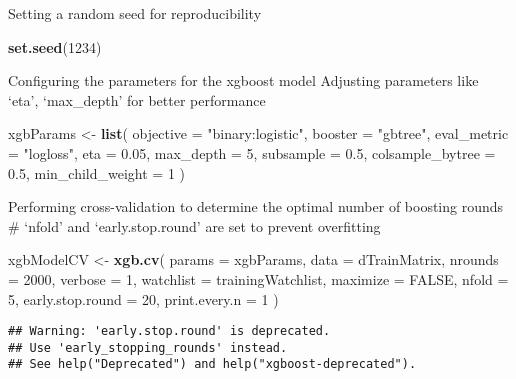 \documentclass[
]{article}
\newenvironment{Shaded}{\begin{snugshade}}{\end{snugshade}}
\newcommand{\AttributeTok}[1]{\textcolor[rgb]{0.13,0.29,0.53}{#1}}
\newcommand{\ConstantTok}[1]{\textcolor[rgb]{0.56,0.35,0.01}{#1}}
\newcommand{\DecValTok}[1]{\textcolor[rgb]{0.00,0.00,0.81}{#1}}
\newcommand{\FloatTok}[1]{\textcolor[rgb]{0.00,0.00,0.81}{#1}}
\newcommand{\FunctionTok}[1]{\textcolor[rgb]{0.13,0.29,0.53}{\textbf{#1}}}
\newcommand{\NormalTok}[1]{#1}
\newcommand{\OtherTok}[1]{\textcolor[rgb]{0.56,0.35,0.01}{#1}}
\newcommand{\StringTok}[1]{\textcolor[rgb]{0.31,0.60,0.02}{#1}}
\begin{document}
Setting a random seed for reproducibility

\begin{Shaded}
\begin{Highlighting}[]
\FunctionTok{set.seed}\NormalTok{(}\DecValTok{1234}\NormalTok{)}
\end{Highlighting}
\end{Shaded}

Configuring the parameters for the xgboost model Adjusting parameters
like `eta', `max\_depth' for better performance

\begin{Shaded}
\begin{Highlighting}[]
\NormalTok{xgbParams }\OtherTok{\textless{}{-}} \FunctionTok{list}\NormalTok{(}
  \AttributeTok{objective =} \StringTok{"binary:logistic"}\NormalTok{,}
  \AttributeTok{booster =} \StringTok{"gbtree"}\NormalTok{,}
  \AttributeTok{eval\_metric =} \StringTok{"logloss"}\NormalTok{,}
  \AttributeTok{eta =} \FloatTok{0.05}\NormalTok{,}
  \AttributeTok{max\_depth =} \DecValTok{5}\NormalTok{,}
  \AttributeTok{subsample =} \FloatTok{0.5}\NormalTok{,}
  \AttributeTok{colsample\_bytree =} \FloatTok{0.5}\NormalTok{,}
  \AttributeTok{min\_child\_weight =} \DecValTok{1}
\NormalTok{)}
\end{Highlighting}
\end{Shaded}

Performing cross-validation to determine the optimal number of boosting
rounds \# `nfold' and `early.stop.round' are set to prevent overfitting

\begin{Shaded}
\begin{Highlighting}[]
\NormalTok{xgbModelCV }\OtherTok{\textless{}{-}} \FunctionTok{xgb.cv}\NormalTok{(}
  \AttributeTok{params =}\NormalTok{ xgbParams, }
  \AttributeTok{data =}\NormalTok{ dTrainMatrix, }
  \AttributeTok{nrounds =} \DecValTok{2000}\NormalTok{,}
  \AttributeTok{verbose =} \DecValTok{1}\NormalTok{,}
  \AttributeTok{watchlist =}\NormalTok{ trainingWatchlist,}
  \AttributeTok{maximize =} \ConstantTok{FALSE}\NormalTok{,}
  \AttributeTok{nfold =} \DecValTok{5}\NormalTok{,}
  \AttributeTok{early.stop.round =} \DecValTok{20}\NormalTok{,}
  \AttributeTok{print.every.n =} \DecValTok{1}
\NormalTok{)}
\end{Highlighting}
\end{Shaded}

\begin{verbatim}
## Warning: 'early.stop.round' is deprecated.
## Use 'early_stopping_rounds' instead.
## See help("Deprecated") and help("xgboost-deprecated").
\end{verbatim}
\end{document}
